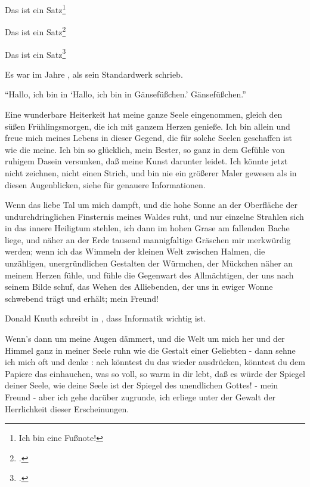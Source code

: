 \documentclass[12pt,ngerman,parskip=half]{scrartcl}
\begin{document}
\cite{knuth:1984}

\parencite{knuth:1984}

Das ist ein Satz\footnote{Ich bin eine Fußnote!}

Das ist ein Satz\footcite[Seite 12]{knuth:1984}

Das ist ein Satz\footcite[Seite 64]{knuth:1984}

Es war im Jahre \citeyear{knuth:1984}, als \citeauthor{knuth:1984} sein Standardwerk  schrieb.

\cite{virt:2020}

\cite{ziegenhagen:2020}


\enquote{Hallo, ich bin in \enquote{Hallo, ich bin in Gänsefüßchen.} Gänsefüßchen.}

Eine wunderbare Heiterkeit hat meine ganze Seele eingenommen, gleich den süßen Frühlingsmorgen, die ich mit ganzem Herzen genieße. Ich bin allein und freue mich meines Lebens in dieser Gegend, die für solche Seelen geschaffen ist wie die meine. Ich bin so glücklich, mein Bester, so ganz in dem Gefühle von ruhigem Dasein versunken, daß meine Kunst darunter leidet. Ich könnte jetzt nicht zeichnen, nicht einen Strich, und bin nie ein größerer Maler gewesen als in diesen Augenblicken, siehe für genauere Informationen.

Wenn das liebe Tal um mich dampft, und die hohe Sonne an der Oberfläche der undurchdringlichen Finsternis meines Waldes ruht, und nur einzelne Strahlen sich in das innere Heiligtum stehlen, ich dann im hohen Grase am fallenden Bache liege, und näher an der Erde tausend mannigfaltige Gräschen mir merkwürdig werden; wenn ich das Wimmeln der kleinen Welt zwischen Halmen, die unzähligen, unergründlichen Gestalten der Würmchen, der Mückchen näher an meinem Herzen fühle, und fühle die Gegenwart des Allmächtigen, der uns nach seinem Bilde schuf, das Wehen des Alliebenden, der uns in ewiger Wonne schwebend trägt und erhält; mein Freund! 

Donald Knuth schreibt in , dass Informatik wichtig ist.

Wenn's dann um meine Augen dämmert, und die Welt um mich her und der Himmel ganz in meiner Seele ruhn wie die Gestalt einer Geliebten - dann sehne ich mich oft und denke : ach könntest du das wieder ausdrücken, könntest du dem Papiere das einhauchen, was so voll, so warm in dir lebt, daß es würde der Spiegel deiner Seele, wie deine Seele ist der Spiegel des unendlichen Gottes! - mein Freund - aber ich gehe darüber zugrunde, ich erliege unter der Gewalt der Herrlichkeit dieser Erscheinungen. 

\printbibliography[title={Bücher},type=book]

\printbibliography[title={Artikel},type=article]
\end{document}
